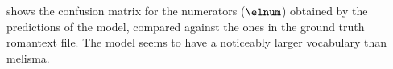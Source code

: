 
 shows the confusion
matrix for the numerators ($\elnum$) obtained by the
predictions of the \textcite{chen2021attend} model, compared
against the ones in the ground truth \gls{romantext} file.
The \textcite{chen2021attend} model seems to have a
noticeably larger vocabulary than \gls{melisma}. 


